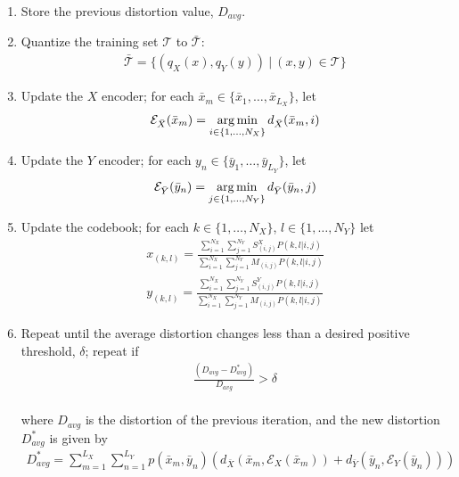 \begin{enumerate}
    \item Store the previous distortion value, $D_{avg}$.
    \item Quantize the training set $\mathcal T$ to $\mathcal{\bar T}$:
    \begin{align}
        \mathcal{\bar T}=\{(q_X(x),q_Y(y))\ |\ (x,y)\in \mathcal T\}
    \end{align}
    \item Update the $X$ encoder; for each $\bar x_m\in \{\bar x_1,\ldots,\bar x_{L_X}\}$, let
    \begin{align}
        \mathcal E_{\bar X}(\bar x_m)=\operatorname*{arg\,min}_{i\in\{1,\ldots,N_X\}}d_{\bar X}(\bar x_m,i)
    \end{align}
    \item Update the $Y$ encoder; for each $y_n\in \{\bar y_1,\ldots,\bar y_{L_Y}\}$, let
    \begin{align}
        \mathcal E_{\bar Y}(\bar y_n)=\operatorname*{arg\,min}_{j\in\{1,\ldots,N_Y\}}d_{\bar Y}(\bar y_n,j)
    \end{align}
    \item Update the codebook; for each $k\in\{1,\ldots,N_X\}$, $l\in\{1,\ldots,N_Y\}$ let
    \begin{align}
        x_{(k,l)} = 
            \frac{\sum_{i=1}^{N_X} \sum_{j=1}^{N_Y}
            S_{(i,j)}^X P(k,l|i,j)}
            {\sum_{i=1}^{N_X} \sum_{j=1}^{N_Y}
            M_{(i,j)} P(k,l|i,j)}\\
        y_{(k,l)} = 
            \frac{\sum_{i=1}^{N_X} \sum_{j=1}^{N_Y}
            S_{(i,j)}^Y P(k,l|i,j)}
            {\sum_{i=1}^{N_X} \sum_{j=1}^{N_Y}
            M_{(i,j)} P(k,l|i,j)}
    \end{align}
    \item Repeat until the average distortion changes less than a desired positive threshold, $\delta$; repeat if
    \begin{align}
        \frac
        {(D_{avg} - D^*_{avg})}
        {D_{avg}}
        > \delta
    \end{align}
    \\
    where $D_{avg}$ is the distortion of the previous iteration, and the new distortion $D^*_{avg}$ is given by
    \begin{align}
        D^*_{avg}=\sum_{m=1}^{L_X}\sum_{n=1}^{L_Y}p(\bar x_m,\bar y_n)\left(d_{\bar X}(\bar x_m,\mathcal E_X(\bar x_m))+d_{\bar Y}(\bar y_n,\mathcal E_Y(\bar y_n))\right)
    \end{align}
\end{enumerate}


